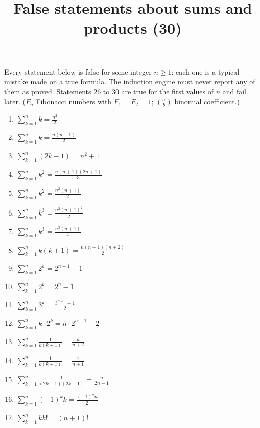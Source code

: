 \documentclass[11pt,a4paper]{article}
\title{False statements about sums and products (30)}
\author{}
\date{}
\begin{document}
\maketitle
Every statement below is false for some integer $n\ge1$: each one is a typical mistake made on a true formula. The induction engine must never report any of them as proved. Statements 26 to 30 are true for the first values of $n$ and fail later. ($F_n$ Fibonacci numbers with $F_1=F_2=1$; $\binom{a}{b}$ binomial coefficient.)

\begin{enumerate}
\item $\displaystyle \sum_{k=1}^{n} k = \frac{n^{2}}{2}$
\item $\displaystyle \sum_{k=1}^{n} k = \frac{n\left(n - 1\right)}{2}$
\item $\displaystyle \sum_{k=1}^{n} \left(2k - 1\right) = n^{2} + 1$
\item $\displaystyle \sum_{k=1}^{n} k^{2} = \frac{n\left(n + 1\right)\left(2n + 1\right)}{3}$
\item $\displaystyle \sum_{k=1}^{n} k^{2} = \frac{n^{2}\left(n + 1\right)}{2}$
\item $\displaystyle \sum_{k=1}^{n} k^{3} = \frac{n^{2}\left(n + 1\right)^{2}}{2}$
\item $\displaystyle \sum_{k=1}^{n} k^{3} = \frac{n^{3}\left(n + 1\right)}{4}$
\item $\displaystyle \sum_{k=1}^{n} k\left(k + 1\right) = \frac{n\left(n + 1\right)\left(n + 2\right)}{2}$
\item $\displaystyle \sum_{k=1}^{n} 2^{k} = 2^{n + 1} - 1$
\item $\displaystyle \sum_{k=1}^{n} 2^{k} = 2^{n} - 1$
\item $\displaystyle \sum_{k=1}^{n} 3^{k} = \frac{3^{n + 1} - 1}{2}$
\item $\displaystyle \sum_{k=1}^{n} k \cdot 2^{k} = n \cdot 2^{n + 1} + 2$
\item $\displaystyle \sum_{k=1}^{n} \frac{1}{k\left(k + 1\right)} = \frac{n}{n + 2}$
\item $\displaystyle \sum_{k=1}^{n} \frac{1}{k\left(k + 1\right)} = \frac{1}{n + 1}$
\item $\displaystyle \sum_{k=1}^{n} \frac{1}{\left(2k - 1\right)\left(2k + 1\right)} = \frac{n}{2n - 1}$
\item $\displaystyle \sum_{k=1}^{n} \left(-1\right)^{k}k = \frac{\left(-1\right)^{n}n}{2}$
\item $\displaystyle \sum_{k=1}^{n} k k! = \left(n + 1\right)!$

\end{enumerate}
\end{document}

